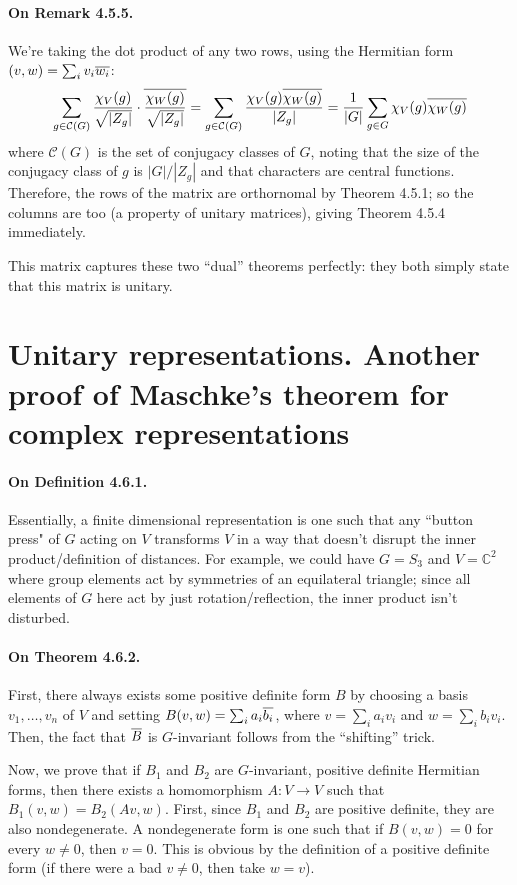 \documentclass[oneside]{scrbook}
\begin{document}
\paragraph{On Remark 4.5.5.} We're taking the dot product of any two rows, using the Hermitian form $(v,w)=\sum_i v_i\overline{w_i}$:
\[\sum_{g\in \mathcal{C}(G)}\frac{\chi_V(g)}{\sqrt{|Z_g|}}\cdot\overline{\frac{\chi_W(g)}{\sqrt{|Z_g|}}}=\sum_{g\in\mathcal{C}(G)}\frac{\chi_V(g)\overline{\chi_W(g)}}{|Z_g|}=\frac{1}{|G|}\sum_{g\in G}\chi_V(g)\overline{\chi_W(g)}\]
where $\mathcal{C}(G)$ is the set of conjugacy classes of $G$, noting that the size of the conjugacy class of $g$ is $|G|/|Z_g|$ and that characters are central functions. Therefore, the rows of the matrix are orthornomal by Theorem 4.5.1; so the columns are too (a property of unitary matrices), giving Theorem 4.5.4 immediately.

This matrix captures these two ``dual'' theorems perfectly: they both simply state that this matrix is unitary.

\section{Unitary representations. Another proof of
Maschke’s theorem for complex
representations}

\paragraph{On Definition 4.6.1.} Essentially, a  finite dimensional representation is one such that any ``button press" of $G$ acting on $V$ transforms $V$ in a way that doesn't disrupt the inner product/definition of distances. For example, we could have $G=S_3$ and $V=\mathbb{C}^2$ where group elements act by symmetries of an equilateral triangle; since all elements of $G$ here act by just rotation/reflection, the inner product isn't disturbed.

\paragraph{On Theorem 4.6.2.} First, there always exists some positive definite form $B$ by choosing a basis $v_1,\ldots,v_n$ of $V$ and setting $B(v,w)=\sum_i a_i\overline{b_i}$, where $v=\sum_i a_iv_i$ and $w=\sum_i b_iv_i$. Then, the fact that $\overline{B}$ is $G$-invariant follows from the ``shifting'' trick. 

Now, we prove that if $B_1$ and $B_2$ are $G$-invariant, positive definite Hermitian forms, then there exists a homomorphism $A\colon V\to V$ such that $B_1(v,w)=B_2(Av,w)$. First, since $B_1$ and $B_2$ are positive definite, they are also nondegenerate. A nondegenerate form is one such that if $B(v,w)=0$ for every $w\neq 0$, then $v=0$. This is obvious by the definition of a positive definite form (if there were a bad $v\neq 0$, then take $w=v$).
\end{document}
